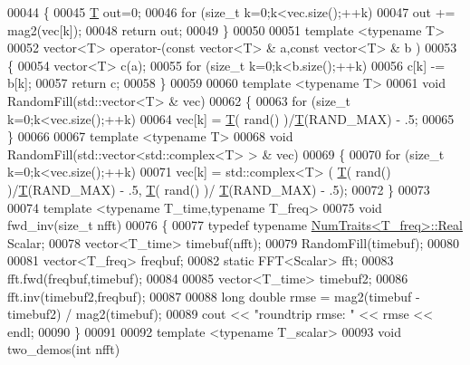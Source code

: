 \begin{DoxyCode}
00044 \{
00045     \hyperlink{group___sparse_core___module}{T} out=0;
00046     \textcolor{keywordflow}{for} (\textcolor{keywordtype}{size\_t} k=0;k<vec.size();++k)
00047         out += mag2(vec[k]);
00048     \textcolor{keywordflow}{return} out;
00049 \}
00050 
00051 \textcolor{keyword}{template} <\textcolor{keyword}{typename} T>
00052 vector<T> operator-(\textcolor{keyword}{const} vector<T> & a,\textcolor{keyword}{const} vector<T> & b )
00053 \{
00054     vector<T> c(a);
00055     \textcolor{keywordflow}{for} (\textcolor{keywordtype}{size\_t} k=0;k<b.size();++k) 
00056         c[k] -= b[k];
00057     \textcolor{keywordflow}{return} c;
00058 \}
00059 
00060 \textcolor{keyword}{template} <\textcolor{keyword}{typename} T>
00061 \textcolor{keywordtype}{void} RandomFill(std::vector<T> & vec)
00062 \{
00063     \textcolor{keywordflow}{for} (\textcolor{keywordtype}{size\_t} k=0;k<vec.size();++k)
00064         vec[k] = \hyperlink{group___sparse_core___module}{T}( rand() )/\hyperlink{group___sparse_core___module}{T}(RAND\_MAX) - .5;
00065 \}
00066 
00067 \textcolor{keyword}{template} <\textcolor{keyword}{typename} T>
00068 \textcolor{keywordtype}{void} RandomFill(std::vector<std::complex<T> > & vec)
00069 \{
00070     \textcolor{keywordflow}{for} (\textcolor{keywordtype}{size\_t} k=0;k<vec.size();++k)
00071         vec[k] = std::complex<T> ( \hyperlink{group___sparse_core___module}{T}( rand() )/\hyperlink{group___sparse_core___module}{T}(RAND\_MAX) - .5, \hyperlink{group___sparse_core___module}{T}( rand() )/
      \hyperlink{group___sparse_core___module}{T}(RAND\_MAX) - .5);
00072 \}
00073 
00074 \textcolor{keyword}{template} <\textcolor{keyword}{typename} T\_time,\textcolor{keyword}{typename} T\_freq>
00075 \textcolor{keywordtype}{void} fwd\_inv(\textcolor{keywordtype}{size\_t} nfft)
00076 \{
00077     \textcolor{keyword}{typedef} \textcolor{keyword}{typename} \hyperlink{group___core___module_struct_eigen_1_1_num_traits}{NumTraits<T\_freq>::Real} Scalar;
00078     vector<T\_time> timebuf(nfft);
00079     RandomFill(timebuf);
00080 
00081     vector<T\_freq> freqbuf;
00082     \textcolor{keyword}{static} FFT<Scalar> fft;
00083     fft.fwd(freqbuf,timebuf);
00084 
00085     vector<T\_time> timebuf2;
00086     fft.inv(timebuf2,freqbuf);
00087 
00088     \textcolor{keywordtype}{long} \textcolor{keywordtype}{double} rmse = mag2(timebuf - timebuf2) / mag2(timebuf);
00089     cout << \textcolor{stringliteral}{"roundtrip rmse: "} << rmse << endl;
00090 \}
00091 
00092 \textcolor{keyword}{template} <\textcolor{keyword}{typename} T\_scalar>
00093 \textcolor{keywordtype}{void} two\_demos(\textcolor{keywordtype}{int} nfft)

\end{DoxyCode}
